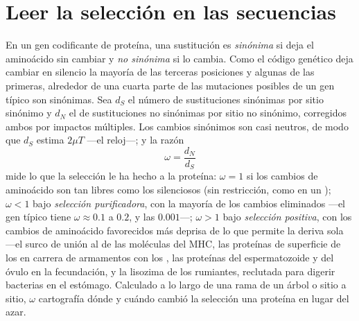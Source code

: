 \section{Leer la selección en las secuencias}

\begin{definition}[dN/dS]\label{def:b3:molecular-evolution:dnds}
En un gen codificante de proteína, una sustitución es \emph{sinónima}
si deja el aminoácido sin cambiar y \emph{no sinónima} si lo cambia.
Como el código genético deja cambiar en silencio la mayoría de las
terceras posiciones y algunas de las primeras, alrededor de una cuarta
parte de las mutaciones posibles de un gen típico son sinónimas. Sea
$d_{S}$ el número de sustituciones sinónimas por sitio sinónimo y
$d_{N}$ el de sustituciones no sinónimas por sitio no sinónimo,
corregidos ambos por impactos múltiples. Los cambios sinónimos son casi
neutros, de modo que $d_{S}$ estima $2\mu T$ ---el reloj---; y la razón
\[
\omega = \frac{d_{N}}{d_{S}}
\]
mide lo que la selección le ha hecho a la proteína: $\omega = 1$ si los
cambios de aminoácido son tan libres como los silenciosos (sin
restricción, como en un ); $\omega < 1$ bajo \emph{selección
purificadora}, con la mayoría de los cambios eliminados ---el gen
típico tiene $\omega \approx 0.1$ a $0.2$, y las  $0.001$---;
$\omega > 1$ bajo \emph{selección positiva}, con los cambios de
aminoácido favorecidos más deprisa de lo que permite la deriva sola
---el surco de unión al  de las moléculas del MHC, las
proteínas de superficie de los  en carrera de armamentos con los
, las proteínas del espermatozoide y del óvulo en la
fecundación, y la lisozima de los rumiantes, reclutada para digerir
bacterias en el estómago. Calculado a lo largo de una rama de un árbol
o sitio a sitio, $\omega$ cartografía dónde y cuándo cambió la
selección una proteína en lugar del azar.
\end{definition}


